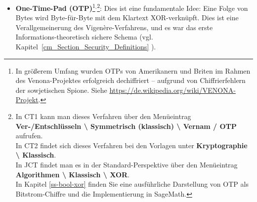 \begin{refsegment}
\begin{itemize}
\begin{itemize}
   \item {\bf Porta} \cite{ACA2002}:
      Vigen\`ere-Variante, die nur 13 Alphabete verwendet. Das bedeutet, dass
      jeweils zwei Schlüsselbuch"-staben dasselbe Geheimtextalphabet zugeordnet
      wird, und die erste und zweite Hälfte des Alphabets reziprok sind.

   \item {\bf Slidefair} \cite{ACA2002}:
      Kann als Vigen\`ere-, Gronsfeld- oder Beaufort-Variante verwendet werden.
      Dieses Verfahren verschlüsselt Digramme. Den ersten Buchstaben sucht man
      im Klartextalphabet über dem Tableau, den zweiten in der Zeile, die dem
      Schlüsselbuch"-staben entspricht. Diese beiden Punkte bilden
      gegenüberliegende Punkte eines gedachten Rechtecks, die verbleibenden
      Ecken bilden die Geheimtextzeichen.

\end{itemize}



       \item {\bf One-Time-Pad (OTP)}\footnote{%
             In größerem Umfang wurden OTPs von Amerikanern und Briten im Rahmen des
	     \glqq Venona\grqq-Projektes erfolgreich dechiffriert -- aufgrund von Chiffrierfehlern
	     der sowjetischen Spione. Siehe \url{https://de.wikipedia.org/wiki/VENONA-Projekt}.
          }$^,$\footnote{%
            In CT1 kann man dieses Verfahren über den
            Menüeintrag {\bf Ver-/Entschlüsseln \textbackslash{} Symmetrisch
            (klassisch) \textbackslash{} Vernam / OTP} aufrufen.\\
            In CT2 findet sich dieses Verfahren bei den Vorlagen
            unter {\bf Kryptographie \textbackslash{} Klassisch}.\\
            In JCT findet man es in der Standard-Perspektive
            über den Menüeintrag {\bf Algorithmen \textbackslash{} Klassisch
            \textbackslash{} XOR}.\\
	    In Kapitel \ref{ss-bool-xor} finden Sie eine ausführliche Darstellung
	    von OTP als Bitstrom-Chiffre und die Implementierung in SageMath.
          }:
          Dies ist eine fundamentale Idee:
	  Eine Folge von Bytes wird Byte-für-Byte mit dem Klartext XOR-verknüpft.
          Dies ist eine Verallgemeinerung des Vigen\`ere-Verfahrens, und es war
          das erste Informations-theoretisch sichere Schema (vgl.
          Kapitel~\ref{cm_Section_Security_Definitions}
          \glqq {}\grqq).
	

\end{itemize}
\end{refsegment}
